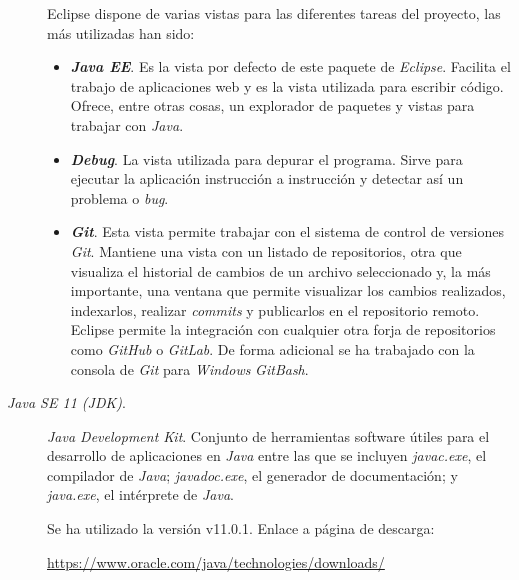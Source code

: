 \begin{description}
		Eclipse dispone de varias vistas para las diferentes tareas del proyecto, las más utilizadas han sido:
		\begin{itemize}
			\item \textbf{\textit{Java EE}}. Es la vista por defecto de este paquete de \textit{Eclipse}. Facilita el trabajo de aplicaciones web y es la vista utilizada para escribir código. Ofrece, entre otras cosas, un explorador de paquetes y vistas para trabajar con \textit{Java}.
			\item \textbf{\textit{Debug}}. La vista utilizada para depurar el programa. Sirve para ejecutar la aplicación instrucción a instrucción y detectar así un problema o \textit{bug}.
			\item \textbf{\textit{Git}}. Esta vista permite trabajar con el sistema de control de versiones \textit{Git}. Mantiene una vista con un listado de repositorios, otra que visualiza el historial de cambios de un archivo seleccionado y, la más importante, una ventana que permite visualizar los cambios realizados, indexarlos, realizar \textit{commits} y publicarlos en el repositorio remoto. Eclipse permite la integración con cualquier otra forja de repositorios como \textit{GitHub} o \textit{GitLab}.
			De forma adicional se ha trabajado con la consola de \textit{Git} para \textit{Windows} \textit{GitBash}.
		\end{itemize}
		
	\item[\textit{Java SE 11 (JDK)}.] \textit{Java Development Kit}. Conjunto de herramientas software útiles para el desarrollo de aplicaciones en \textit{Java} entre las que se incluyen \textit{javac.exe}, el compilador de \textit{Java}; \textit{javadoc.exe}, el generador de documentación; y \textit{java.exe}, el intérprete de \textit{Java}.
	
		Se ha utilizado la versión  v11.0.1. Enlace a página de descarga:
		
		\url{https://www.oracle.com/java/technologies/downloads/}
	

\end{description}
